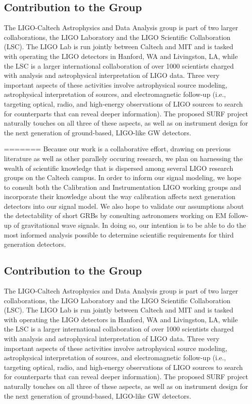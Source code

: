 \documentclass{article}
\begin{document}
\subsection*{Contribution to the Group}

The LIGO-Caltech Astrophysics and Data Analysis group is part of two larger collaborations, the LIGO Laboratory and the LIGO Scientific Collaboration (LSC). The LIGO Lab is run jointly between Caltech and MIT and is tasked with operating the LIGO detectors in Hanford, WA and Livingston, LA, while the LSC is a larger international collaboration of over 1000 scientists charged with analysis and astrophysical interpretation of LIGO data. Three very important aspects of these activities involve astrophysical source modeling, astrophysical interpretation of sources, and electromagnetic follow-up (i.e., targeting optical, radio, and high-energy observations of LIGO sources to search for counterparts that can reveal deeper information). The proposed SURF project naturally touches on all three of these aspects, as well as on instrument design for the next generation of ground-based, LIGO-like GW detectors.
   
=======
Because our work is a collaborative effort, drawing on previous literature as well as other parallely occuring research, we plan on harnessing the wealth of scientific knowledge that is dispersed among several LIGO research groups on the Caltech campus.  In order to inform our signal modeling, we hope to consult both the Calibration and Instrumentation LIGO working  groups and incorporate their knowledge about the way calibration affects next generation detectors into our signal model.  We also hope to validate our assumptions about the detectability of short GRBs by consulting astronomers working on EM follow-up of gravitational wave signals.  In doing so, our intention is to be able to do the most informed analysis possible to determine scientific requirements for third generation detectors.   

\subsection*{Contribution to the Group}

	The LIGO-Caltech Astrophysics and Data Analysis group is part of two larger collaborations, the LIGO Laboratory and the LIGO Scientific Collaboration (LSC). The LIGO Lab is run jointly between Caltech and MIT and is tasked with operating the LIGO detectors in Hanford, WA and Livingston, LA, while the LSC is a larger international collaboration of over 1000 scientists charged with analysis and astrophysical interpretation of LIGO data. Three very important aspects of these activities involve astrophysical source modeling, astrophysical interpretation of sources, and electromagnetic follow-up (i.e., targeting optical, radio, and high-energy observations of LIGO sources to search for counterparts that can reveal deeper information). The proposed SURF project naturally touches on all three of these aspects, as well as on instrument design for the next generation of ground-based, LIGO-like GW detectors.
\end{document}

